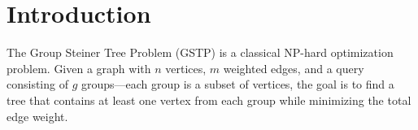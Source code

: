 \section{Introduction}
\label{sec: introduction}
The Group Steiner Tree Problem (GSTP) is a classical NP-hard optimization problem. Given a graph with $n$ vertices, $m$ weighted edges, and a query consisting of $g$ groups---each group is a subset of vertices, the goal is to find a tree that contains at least one vertex from each group while minimizing the total edge weight.


